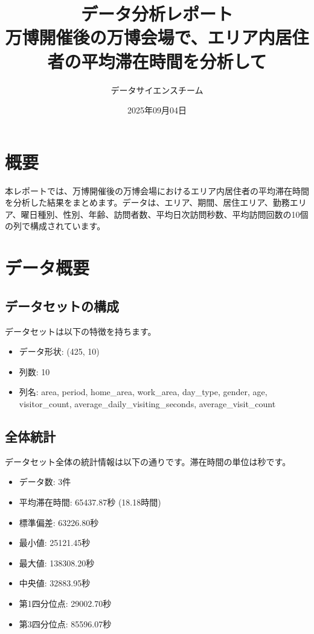 \documentclass[11pt,a4paper]{article}
\title{\textbf{データ分析レポート} \\ 万博開催後の万博会場で、エリア内居住者の平均滞在時間を分析して}
\author{データサイエンスチーム}
\date{2025年09月04日}
\begin{document}
\maketitle
\tableofcontents
\newpage

\section{概要}

本レポートでは、万博開催後の万博会場におけるエリア内居住者の平均滞在時間を分析した結果をまとめます。データは、エリア、期間、居住エリア、勤務エリア、曜日種別、性別、年齢、訪問者数、平均日次訪問秒数、平均訪問回数の10個の列で構成されています。

\section{データ概要}

\subsection{データセットの構成}

データセットは以下の特徴を持ちます。

\begin{itemize}
    \item データ形状: (425, 10)
    \item 列数: 10
    \item 列名: area, period, home\_area, work\_area, day\_type, gender, age, visitor\_count, average\_daily\_visiting\_seconds, average\_visit\_count
\end{itemize}

\subsection{全体統計}

データセット全体の統計情報は以下の通りです。滞在時間の単位は秒です。

\begin{itemize}
    \item データ数: 3件
    \item 平均滞在時間: 65437.87秒 (18.18時間)
    \item 標準偏差: 63226.80秒
    \item 最小値: 25121.45秒
    \item 最大値: 138308.20秒
    \item 中央値: 32883.95秒
    \item 第1四分位点: 29002.70秒
    \item 第3四分位点: 85596.07秒
\end{itemize}
\end{document}
